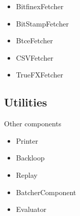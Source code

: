 \begin{itemize}
\item BitfinexFetcher
\item BitStampFetcher
\item BtceFetcher
\item CSVFetcher
\item TrueFXFetcher
\end{itemize}

\subsection{Utilities}

Other components

\begin{itemize}
\item Printer
\item Backloop
\item Replay
\item BatcherComponent
\item Evaluator
\end{itemize}
